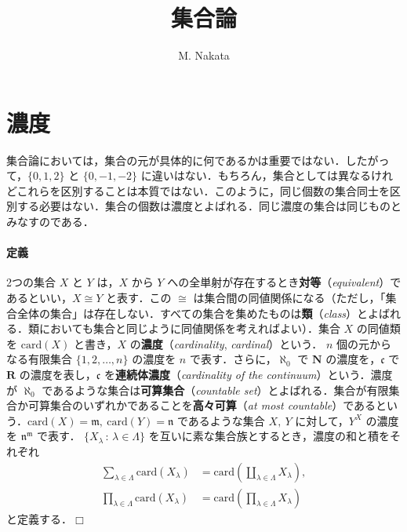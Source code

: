 \documentclass[b5paper,pandoc]{bxjsarticle}
\title{集合論}
\author{M. Nakata}
\date{}
\let\oldparagraph\paragraph
\renewcommand{\paragraph}[1]{\oldparagraph{#1}\mbox{}}
\begin{document}
\maketitle

{
\setcounter{tocdepth}{3}
\tableofcontents
}
\hypertarget{ux6fc3ux5ea6}{%
\section{濃度}\label{ux6fc3ux5ea6}}

集合論においては，集合の元が具体的に何であるかは重要ではない．したがって，\(\{ 0, 1, 2 \}\)
と \(\{ 0, -1, -2 \}\)
に違いはない．もちろん，集合としては異なるけれどこれらを区別することは本質ではない．このように，同じ個数の集合同士を区別する必要はない．集合の個数は濃度とよばれる．同じ濃度の集合は同じものとみなすのである．

\hypertarget{ux5b9aux7fa9}{%
\paragraph{定義}\label{ux5b9aux7fa9}}

2つの集合 \(X\) と \(Y\) は，\(X\) から \(Y\)
への全単射が存在するとき\textbf{対等}（\emph{equivalent}）であるといい，\(X \cong Y\)
と表す．この \(\cong\)
は集合間の同値関係になる（ただし，「集合全体の集合」は存在しない．すべての集合を集めたものは\textbf{類}（\emph{class}）とよばれる．類においても集合と同じように同値関係を考えればよい）．集合
\(X\) の同値類を \(\mathrm{card}(X)\) と書き，\(X\)
の\textbf{濃度}（\emph{cardinality}, \emph{cardinal}）という． \(n\)
個の元からなる有限集合 \(\{1, 2, \dotsc, n \}\) の濃度を \(n\)
で表す．さらに，\(\aleph_0\) で \(\boldsymbol N\)
の濃度を，\(\mathfrak c\) で \(\boldsymbol R\)
の濃度を表し，\(\mathfrak c\) を\textbf{連続体濃度}（\emph{cardinality
of the continuum}）という．濃度が \(\aleph_0\)
であるような集合は\textbf{可算集合}（\emph{countable
set}）とよばれる．集合が有限集合か可算集合のいずれかであることを\textbf{高々可算}（\emph{at
most
countable}）であるという．\(\mathrm{card}(X) = \mathfrak m,\ \mathrm{card}(Y) = \mathfrak n\)
であるような集合 \(X,\ Y\) に対して，\(Y^X\) の濃度を
\(\mathfrak n^{\mathfrak m}\) で表す．
\(\{ X_\lambda \,:\,\lambda \in \Lambda \}\)
を互いに素な集合族とするとき，濃度の和と積をそれぞれ \begin{align*}
\sum_{\lambda \in \Lambda} \mathrm{card}(X_\lambda) &= \mathrm{card}(\coprod_{\lambda \in \Lambda} X_\lambda),\\
\prod_{\lambda \in \Lambda} \mathrm{card}(X_\lambda) &= \mathrm{card}(\prod_{\lambda \in \Lambda} X_\lambda)
\end{align*} と定義する．\(\Box\)
\end{document}
